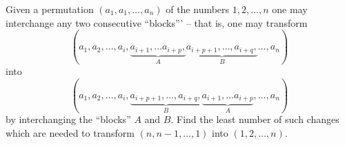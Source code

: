 Given a permutation $(a_{1}, a_{1}, \dots, a_{n})$ of the numbers $1, 2, \dots, n$ one may interchange any two consecutive ``blocks''' -- that is, one may transform
\[(a_{1}, a_{2},\dots,a_{i}, \underbrace {a_{i+1},\dots a_{i+p},}_{A} \underbrace{a_{i+p+1},\dots,a_{i+q},}_{B}\dots,a_{n})\]
into
\[(a_{1}, a_{2},\dots,a_{i}, \underbrace {a_{i+p+1},\dots,a_{i+q},}_{B} \underbrace {a_{i+1},\dots a_{i+p}}_{A}, \dots,a_{n}) \]
by interchanging the ``blocks'' $A$ and $B$.
Find the least number of such changes which are needed to transform $(n, n-1,\dots,1)$ into $(1,2,\dots,n)$.
